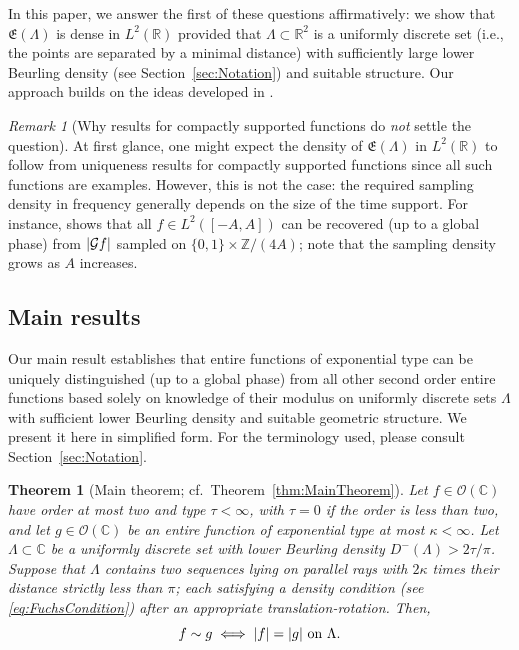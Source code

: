 \documentclass{article}
\newcommand{\bbC}{\mathbb{C}}
\newcommand{\bbR}{\mathbb{R}}
\newcommand{\bbZ}{\mathbb{Z}}
\newcommand{\calG}{\mathcal{G}}
\newcommand{\calO}{\mathcal{O}}
\DeclarePairedDelimiter{\abs}{\lvert}{\rvert}
\newtheorem{theorem}{Theorem}
\theoremstyle{remark}
\newtheorem{remark}{Remark}
\begin{document}
    In this paper, we answer the first of these questions affirmatively: we show that $\mathfrak{E}(\Lambda)$ is dense in $L^2(\bbR)$ provided that $\Lambda \subset \bbR^2$ is a uniformly discrete set (i.e., the points are separated by a minimal distance) with sufficiently large lower Beurling density (see Section~\ref{sec:Notation}) and suitable structure. Our approach builds on the ideas developed in \cite{Alaifari2024On}.

    \begin{remark}[Why results for compactly supported functions do \emph{not} settle the question]
        At first glance, one might expect the density of $\mathfrak{E}(\Lambda)$ in $L^2(\bbR)$ to follow from uniqueness results for compactly supported functions since all such functions are examples. However, this is not the case: the required sampling density in frequency generally depends on the size of the time support. For instance, \cite{Wellershoff2023Sampling} shows that all $f \in L^2([-A,A])$ can be recovered (up to a global phase) from $\abs{\calG f}$ sampled on $\lbrace 0, 1 \rbrace \times \bbZ/(4A)$; note that the sampling density grows as $A$ increases.
    \end{remark}

    \subsection{Main results}

    Our main result establishes that entire functions of exponential type can be uniquely distinguished (up to a global phase) from all other second order entire functions based solely on knowledge of their modulus on uniformly discrete sets $\Lambda$ with sufficient lower Beurling density and suitable geometric structure. We present it here in simplified form. For the terminology used, please consult Section~\ref{sec:Notation}.

    \begin{theorem}[Main theorem; cf.~Theorem~\ref{thm:MainTheorem}]\label{thm:MainThmIntro}
        Let $f \in \calO(\bbC)$ have order at most two and type $\tau < \infty$, with $\tau = 0$ if the order is less than two, and let $g \in \calO(\bbC)$ be an entire function of exponential type at most $\kappa < \infty$. Let $\Lambda \subset \bbC$ be a uniformly discrete set with lower Beurling density $D^{-}(\Lambda) > 2\tau/\pi$. Suppose that $\Lambda$ contains two sequences lying on parallel rays with $2 \kappa$ times their distance strictly less than $\pi$; each satisfying a density condition (see \eqref{eq:FuchsCondition}) after an appropriate translation-rotation. Then,
        \begin{equation*}
            f \sim g \iff \abs{f} = \abs{g} \text{ on } \Lambda.
        \end{equation*}
    \end{theorem}
\end{document}
